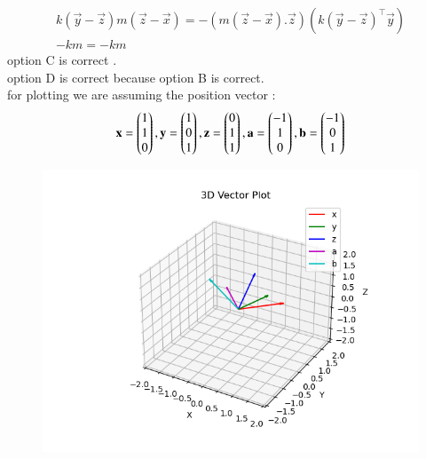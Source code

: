 \documentclass[journal,12pt,onecolumn]{IEEEtran}
\begin{document}
\begin{align*}
    k(\vec{y}-\vec{z})m(\vec{z}-\vec{x})=-( m(\vec{z}-\vec{x}).\vec{z})(k(\vec{y}-\vec{z})^\top\vec{y})
    \\
    -km=-km
\end{align*}
option C is correct  .
\\
option D is correct because option B is correct.
\\
for plotting we are assuming the position vector :
\\
\begin{align*}
    \mathbf x=\begin{pmatrix}1\\1\\0\end{pmatrix},\mathbf y=\begin{pmatrix}1\\0\\1\end{pmatrix},\mathbf z=\begin{pmatrix}0\\1\\1\end{pmatrix},\mathbf a=\begin{pmatrix}-1\\1\\0\end{pmatrix},\mathbf b=\begin{pmatrix}-1\\0\\1\end{pmatrix}
\end{align*}



 \begin{figure}[H]
    \centering
    \includegraphics[width = 0.7\columnwidth]{figs/img.png}
    \caption*{}
    \label{figs}
\end{figure}
\end{document}
